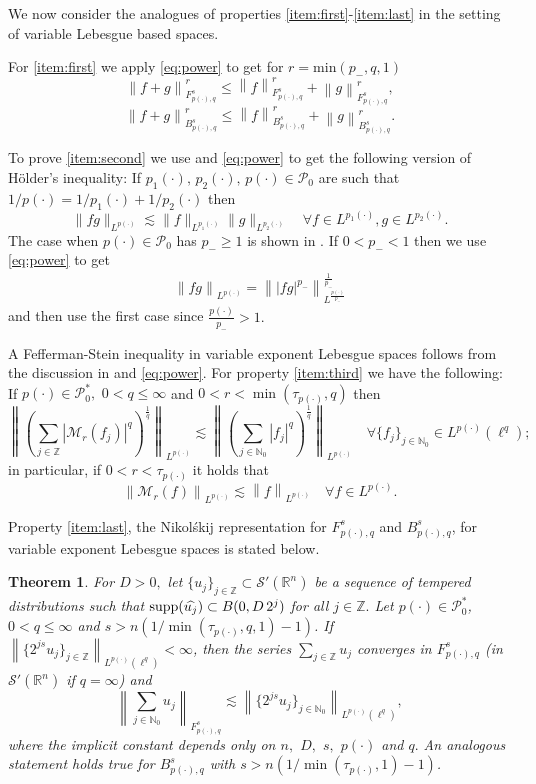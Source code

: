 \documentclass[10pt,a4paper]{article}
\newtheorem{theorem}{Theorem}[section]
\theoremstyle{remark}
\newcommand{\na}{\mathbb{N}}
\newcommand{\ent}{\mathbb{Z}}
\newcommand{\rn}{{{\mathbb R}^n}}
\newcommand{\swp}{{\mathcal{S}'}(\rn)}
\newcommand{\itl}[3]{F_{#1,#3}^{#2}} %
\newcommand{\ibes}[3]{B_{#1,#3}^{#2}} %
\newcommand{\Lp}{L^{p(\cdot)}} %
\newcommand{\pp}{{p(\cdot)}}
\newcommand{\ppo}{{p_1(\cdot)}}
\newcommand{\ppt}{{p_2(\cdot)}}
\newcommand{\M}{\mathcal{M}} %
\def\P{\mathcal P}
\newcommand{\abs}[1]{\left\vert #1 \right\vert}
\newcommand{\norm}[2]{\left\|#1\right\|_{#2}}
\newcommand{\supp}{{\rm{supp}}}
\newcommand{\A}{D}
\begin{document}
We now consider the analogues of properties \ref{item:first}-\ref{item:last} in the setting of variable Lebesgue based spaces. 

For \ref{item:first} we apply \ref{eq:power} to get for $r = \text{min}(p_-,q,1)$
\[\norm{f+g}{\itl{\pp}{s}{q}}^r \leq \norm{f}{\itl{\pp}{s}{q}}^r + \norm{g}{\itl{\pp}{s}{q}}^r, \]
\[\norm{f+g}{\ibes{\pp}{s}{q}}^r \leq \norm{f}{\ibes{\pp}{s}{q}}^r + \norm{g}{\ibes{\pp}{s}{q}}^r. \]

To prove \ref{item:second} we use \cite[Corollary 2.28]{MR3026953} and \ref{eq:power} to get the following version of H\"older's inequality: If $\ppo,\, \ppt,\, \pp \in \P_0$ are such that
$ {1}/{\pp} = {1}/{\ppo} + {1}/{\ppt}$ then
\begin{equation*}
 \|fg\|_{L^\pp} \lesssim \|f\|_{L^\ppo}\|g\|_{L^\ppt}\quad \forall f\in L^\ppo, g\in L^\ppt.
 \end{equation*}
The case when $\pp \in \P_0$ has $p_- \geq 1$ is shown in \cite[Corollary 2.28]{MR3026953}. If $0<p_-<1$ then we use \ref{eq:power} to get 
\begin{align*}
\norm{fg}{L^\pp} = \norm{|fg|^{p_-}}{L^{\frac{\pp}{p_-}}}^{\frac{1}{p_-}}
\end{align*}
and then use the first case since $\frac{\pp}{p_-}>1.$

A Fefferman-Stein inequality in variable exponent Lebesgue spaces follows from the discussion in \cite[Section 5.6.8]{MR3026953} and \eqref{eq:power}. For property \ref{item:third} we have the following:
If $\pp\in\P_0^*,$  $0<q\le \infty$  and $0<r<\min(\tau_{\pp},q)$ then
\begin{equation*}
\norm{\left(\sum_{j\in\ent} \abs{\M_r(f_j)}^q\right)^{\frac{1}{q}}}{\Lp}\lesssim \norm{\left(\sum_{j\in\na_0} \abs{f_j}^q\right)^{\frac{1}{q}}}{\Lp}\quad \forall \{f_j\}_{j\in \na_0}\in \Lp(\ell^q);
\end{equation*}
in particular, if $0<r<\tau_{\pp}$ it holds that 
\begin{equation*}
\norm{\M_r(f)}{\Lp}\lesssim \norm{f}{\Lp}\quad \forall f\in \Lp.
\end{equation*}

Property \ref{item:last}, the Nikol\'skij representation for $\itl{\pp}{s}{q}$ and $\ibes{\pp}{s}{q}$, for variable exponent Lebesgue spaces is stated below.
\begin{theorem}\label{thm:Nikolskij:variable} For $\A> 0,$ let $\{u_j\}_{j \in \ent} \subset \mathcal{S}'(\rn)$ be a sequence of tempered distributions such that $\supp(\widehat{u_j}) \subset B(0, \A\, 2^j ) $ for all $j \in \ent.$
Let $ \pp\in \P_0^*$, $0 < q \le \infty$ and $s > n(1/\min(\tau_{\pp},q,1)-1)$. If $\norm{\{2^{js} u_j\}_{j\in\ent}}{\Lp(\ell^{q})} < \infty$, then the series $\sum_{j \in \ent} u_j$ converges in $\itl{\pp}{s}{q}$ (in $\swp$ if $q=\infty$) and 
\begin{equation*}
\norm{\sum_{j \in \na_0} u_j}{\itl{\pp}{s}{q}} \lesssim  \norm{\{2^{js} u_j\}_{j\in\na_0}}{L^\pp(\ell^{q})},
\end{equation*}
where the implicit constant depends only on $n,$ $\A,$ $s,$ $\pp$ and  $q.$  An analogous statement holds true for $\ibes{\pp}{s}{q}$ with $s> n(1/\min(\tau_{\pp},1)-1)$.
\end{theorem}
\end{document}
